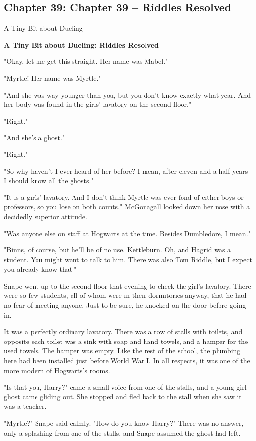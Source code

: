 \documentclass[a4paper,11pt]{article}
\begin{document}
\subsection{Chapter 39: Chapter 39 – Riddles Resolved}

A Tiny Bit about Dueling

\textbf{A Tiny Bit about Dueling: Riddles Resolved}

"Okay, let me get this straight. Her name was Mabel."

"Myrtle! Her name was Myrtle."

"And she was way younger than you, but you don't know exactly what year. And her body was found in the girls' lavatory on the second floor."

"Right."

"And she's a ghost."

"Right."

"So why haven't I ever heard of her before? I mean, after eleven and a half years I should know all the ghosts."

"It is a girls' lavatory. And I don't think Myrtle was ever fond of either boys or professors, so you lose on both counts." McGonagall looked down her nose with a decidedly superior attitude.

"Was anyone else on staff at Hogwarts at the time. Besides Dumbledore, I mean."

"Binns, of course, but he'll be of no use. Kettleburn. Oh, and Hagrid was a student. You might want to talk to him. There was also Tom Riddle, but I expect you already know that."

Snape went up to the second floor that evening to check the girl's lavatory. There were so few students, all of whom were in their dormitories anyway, that he had no fear of meeting anyone. Just to be sure, he knocked on the door before going in.

It was a perfectly ordinary lavatory. There was a row of stalls with toilets, and opposite each toilet was a sink with soap and hand towels, and a hamper for the used towels. The hamper was empty. Like the rest of the school, the plumbing here had been installed just before World War I. In all respects, it was one of the more modern of Hogwarts's rooms.

"Is that you, Harry?" came a small voice from one of the stalls, and a young girl ghost came gliding out. She stopped and fled back to the stall when she saw it was a teacher.

"Myrtle?" Snape said calmly. "How do you know Harry?" There was no answer, only a splashing from one of the stalls, and Snape assumed the ghost had left.
\end{document}
